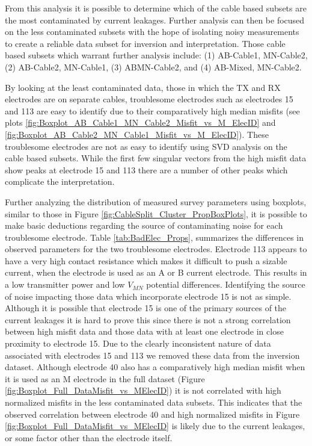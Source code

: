 \documentclass[final,authoryear,5p,times,twocolumn]{elsarticle}
\begin{document}
From this analysis it is possible to determine which of the cable based subsets are the most contaminated by current leakages. Further analysis can then be focused on the less contaminated subsets with the hope of isolating noisy measurements to create a reliable data subset for inversion and interpretation. Those cable based subsets which warrant further analysis include: (1) AB-Cable1, MN-Cable2, (2) AB-Cable2, MN-Cable1, (3) ABMN-Cable2, and (4) AB-Mixed, MN-Cable2.

By looking at the least contaminated data, those in which the TX and RX electrodes are on separate cables, troublesome electrodes such as electrodes 15 and 113 are easy to identify due to their comparatively high median misfits (see plots \ref{fig:Boxplot_AB_Cable1_MN_Cable2_Misfit_vs_M_ElecID} and \ref{fig:Boxplot_AB_Cable2_MN_Cable1_Misfit_vs_M_ElecID}). These troublesome electrodes are not as easy to identify using SVD analysis on the cable based subsets. While the first few singular vectors from the high misfit data show peaks at electrode 15 and 113 there are a number of other peaks which complicate the interpretation.

Further analyzing the distribution of measured survey parameters using boxplots, similar to those in Figure \ref{fig:CableSplit_Cluster_PropBoxPlots}, it is possible to make basic deductions regarding the source of contaminating noise for each troublesome electrode. Table \ref{tab:BadElec_Props}, summarizes the differences in observed parameters for the two troublesome electrodes. Electrode 113 appears to have a very high contact resistance which makes it difficult to push a sizable current, when the electrode is used as an A or B current electrode. This results in a low transmitter power and low $V_{MN}$ potential differences. Identifying the source of noise impacting those data which incorporate electrode 15 is not as simple. Although it is possible that electrode 15 is one of the primary sources of the current leakages it is hard to prove this since there is not a strong correlation between high misfit data and those data with at least one electrode in close proximity to electrode 15. Due to the clearly inconsistent nature of data associated with electrodes 15 and 113 we removed these data from the inversion dataset. Although electrode 40 also has a comparatively high median misfit when it is used as an M electrode in the full dataset (Figure \ref{fig:Boxplot_Full_DataMisfit_vs_MElecID}) it is not correlated with high normalized misfits in the less contaminated data subsets. This indicates that the observed correlation between electrode 40 and high normalized misfits in Figure \ref{fig:Boxplot_Full_DataMisfit_vs_MElecID} is likely due to the current leakages, or some factor other than the electrode itself.
\end{document}
